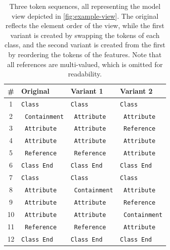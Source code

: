 \begin{samepage}
\begin{table}[b]
    \centering
    \begin{tabular}{clll}
		\toprule
		\# & \textbf{Original}     & \textbf{Variant 1}    & \textbf{Variant 2}    \\
		\midrule
		1  & \texttt{Class}        & \texttt{Class}        & \texttt{Class}        \\
		2  & \texttt{ Containment} & \texttt{ Attribute}   & \texttt{ Attribute}   \\
		3  & \texttt{ Attribute}   & \texttt{ Attribute}   & \texttt{ Reference}   \\
		4  & \texttt{ Attribute}   & \texttt{ Attribute}   & \texttt{ Attribute}   \\
		5  & \texttt{ Reference}   & \texttt{ Reference}   & \texttt{ Attribute}   \\
		6  & \texttt{Class End}    & \texttt{Class End}    & \texttt{Class End}   \\
		7  & \texttt{Class}        & \texttt{Class}        & \texttt{Class}    \\
		8  & \texttt{ Attribute}   & \texttt{ Containment} & \texttt{ Attribute}   \\
		9  & \texttt{ Attribute}   & \texttt{ Attribute}   & \texttt{ Reference} \\
		10 & \texttt{ Attribute}   & \texttt{ Attribute}   & \texttt{ Containment}   \\
		11 & \texttt{ Reference}   & \texttt{ Reference}   & \texttt{ Attribute}   \\
		12 & \texttt{Class End}    & \texttt{Class End}    & \texttt{Class End}    \\
		\bottomrule
    \end{tabular}
    \caption[Example Obfuscation: Reordering]{Three token sequences, all representing the model view depicted in \autoref{fig:example-view}. The original reflects the element order of the view, while the first variant is created by swapping the tokens of each class, and the second variant is created from the first by reordering the tokens of the features. Note that all references are multi-valued, which is omitted for readability.}
    \label{tab:example-view}
\end{table}
\end{samepage}

